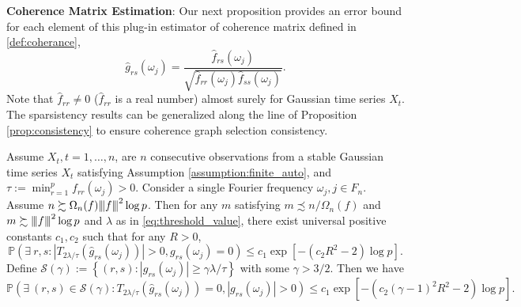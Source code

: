 \noindent \textbf{Coherence Matrix Estimation}:
Our next proposition provides an error bound for each element of this plug-in estimator of coherence matrix defined in \eqref{def:coherance}, 
\begin{equation}
\hat{g}_{rs}(\omega_j) = \frac{\hat{f}_{rs}(\omega_j)}{\sqrt{\hat{f}_{rr}(\omega_j)\hat{f}_{ss}(\omega_j)}}. \nonumber
\end{equation}
Note that $\hat{f}_{rr} \neq 0$ ($\hat{f}_{rr}$ is a real number) almost surely for Gaussian time series $X_t$. The sparsistency results can be generalized along the line of Proposition \ref{prop:consistency} to ensure coherence graph selection consistency.
\begin{prop}
\label{prop:coherance}
Assume ${X}_t, t=1,\ldots,n$, are $n$ consecutive observations from a stable Gaussian time series $X_t$ satisfying Assumption \ref{assumption:finite_auto}, and $\tau := \min_{r=1}^p f_{rr}(\omega_j)>0$. Consider a single Fourier frequency $\omega_j, j\in F_n$. Assume $n \succsim \Omega_n(f) {\left\vert\kern-0.25ex\left\vert\kern-0.25ex\left\vert f \right\vert\kern-0.25ex\right\vert\kern-0.25ex\right\vert}^2 \log p$. Then for any $m $ satisfying $m \precsim n/ \Omega_n(f)$ and $m \succsim {\left\vert\kern-0.25ex\left\vert\kern-0.25ex\left\vert f \right\vert\kern-0.25ex\right\vert\kern-0.25ex\right\vert}^2\log p$ and $\lambda$ as in  \eqref{eq:threshold_value}, there exist universal positive constants $c_1, c_2$ such that for any $R>0$, \begin{equation}
\mathbb{P}\left(\exists ~r,s : |T_{2\lambda/\tau}(\hat{g}_{rs}(\omega_j))|>0, g_{rs}(\omega_j)=0\right)\le  c_1\exp[-(c_2R^2-2) \log p]. \nonumber
\end{equation}
Define $\mathcal{S}(\gamma) := \left\{(r,s):|g_{rs}(\omega_j)|\ge \gamma\lambda /\tau \right\}$ with some $\gamma>3/2$. Then we have 
\begin{equation}
\mathbb{P}\left(\exists ~(r,s) \in \mathcal{S}(\gamma) : T_{2\lambda/\tau}(\hat{g}_{rs}(\omega_j))=0, |g_{rs}(\omega_j)| >0\right)\le  c_1\exp[-(c_2 (\gamma-1)^2R^2-2) \log p]. \nonumber
\end{equation}

\end{prop}



